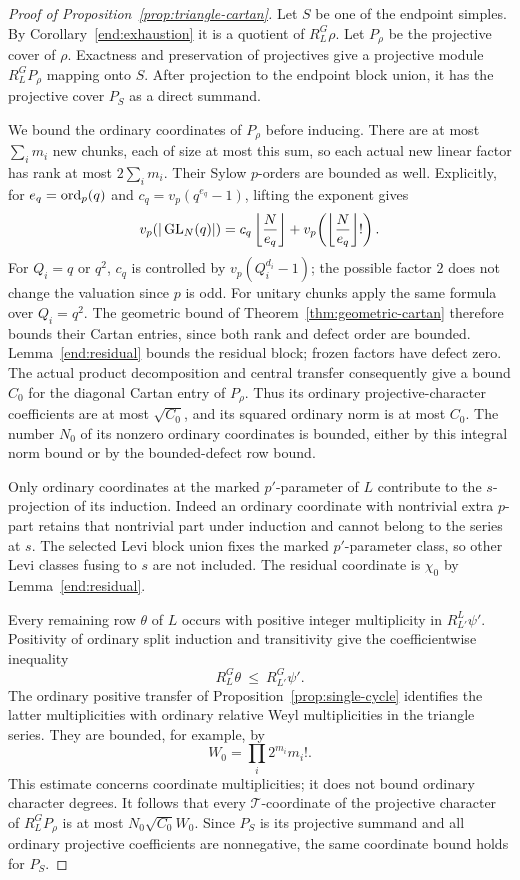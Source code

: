 \begin{proof}[Proof of Proposition~\ref{prop:triangle-cartan}]
Let $S$ be one of the endpoint simples.  By
Corollary~\ref{end:exhaustion} it is a quotient of
$R_L^G\rho$.  Let $P_\rho$ be the projective cover of
$\rho$.  Exactness and preservation of projectives give
a projective module $R_L^G P_\rho$ mapping onto $S$.
After projection to the endpoint block union, it has the
projective cover $P_S$ as a direct summand.

We bound the ordinary coordinates of $P_\rho$ before
inducing.  There are at most $\sum_i m_i$ new chunks,
each of size at most this sum, so each actual new linear
factor has rank at most $2\sum_i m_i$.  Their Sylow
$p$-orders are bounded as well.  Explicitly, for
$e_q=\operatorname{ord}_p(q)$ and $c_q=v_p(q^{e_q}-1)$, lifting the
exponent gives
\begin{equation}\label{end:gl-order}
 v_p(|\operatorname{GL}_N(q)|)
 =c_q\left\lfloor\frac N{e_q}\right\rfloor
  +v_p\!\left(\left\lfloor\frac N{e_q}\right\rfloor!\right).
\end{equation}
For $Q_i=q$ or $q^2$, $c_q$ is controlled by
$v_p(Q_i^{d_i}-1)$; the possible factor $2$ does not
change the valuation since $p$ is odd.  For unitary
chunks apply the same formula over $Q_i=q^2$.
The geometric bound of Theorem~\ref{thm:geometric-cartan}
therefore bounds their Cartan entries, since both rank
and defect order are bounded.  Lemma~\ref{end:residual}
bounds the residual block; frozen factors have defect
zero.  The actual product decomposition and central
transfer consequently give a bound $C_0$ for the
diagonal Cartan entry of $P_\rho$.  Thus its ordinary
projective-character coefficients are at most
$\sqrt{C_0}$, and its squared ordinary norm is at most
$C_0$.  The number $N_0$ of its nonzero ordinary
coordinates is bounded, either by this integral norm
bound or by the bounded-defect row bound.

Only ordinary coordinates at the marked $p'$-parameter
of $L$ contribute to the $s$-projection of its induction.
Indeed an ordinary coordinate with nontrivial extra
$p$-part retains that nontrivial part under induction
and cannot belong to the series at $s$.
The selected Levi block union fixes the marked
$p'$-parameter class, so other Levi classes fusing to
$s$ are not included.  The residual coordinate is
$\chi_0$ by Lemma~\ref{end:residual}.

Every remaining row $\theta$ of $L$ occurs with positive
integer multiplicity in $R_{L'}^L\psi'$.  Positivity of
ordinary split induction and transitivity give the
coefficientwise inequality
\[
 R_L^G\theta\ \leq\ R_{L'}^G\psi'.
\]
The ordinary positive transfer of
Proposition~\ref{prop:single-cycle} identifies the
latter multiplicities with ordinary relative Weyl
multiplicities in the triangle series.  They are
bounded, for example, by
\[
 W_0=\prod_i 2^{m_i}m_i!.
\]
This estimate concerns coordinate multiplicities; it
does not bound ordinary character degrees.
It follows that every $\mathcal T$-coordinate of the
projective character of $R_L^G P_\rho$ is at most
$N_0\sqrt{C_0}W_0$.  Since $P_S$ is its projective
summand and all ordinary projective coefficients are
nonnegative, the same coordinate bound holds for
$P_S$.


\end{proof}
